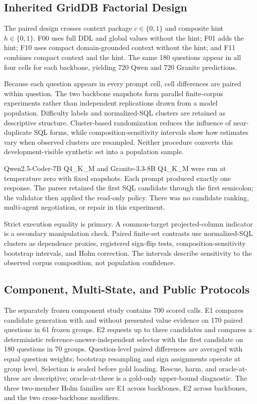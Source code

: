 \documentclass[applsci,article,submit,moreauthors]{Definitions/mdpi}
\begin{document}
\subsection{Inherited GridDB Factorial Design}

The paired design crosses context package $c\in\{0,1\}$ and composite hint $h\in\{0,1\}$. F00 uses full DDL and global values without the hint; F01 adds the hint; F10 uses compact domain-grounded context without the hint; and F11 combines compact context and the hint. The same 180 questions appear in all four cells for each backbone, yielding 720 Qwen and 720 Granite predictions.

Because each question appears in every prompt cell, cell differences are paired within question. The two backbone snapshots form parallel finite-corpus experiments rather than independent replications drawn from a model population. Difficulty labels and normalized-SQL clusters are retained as descriptive structure. Cluster-based randomization reduces the influence of near-duplicate SQL forms, while composition-sensitivity intervals show how estimates vary when observed clusters are resampled. Neither procedure converts this development-visible synthetic set into a population sample.

Qwen2.5-Coder-7B Q4\_K\_M and Granite-3.3-8B Q4\_K\_M were run at temperature zero with fixed snapshots. Each prompt produced exactly one response. The parser retained the first SQL candidate through the first semicolon; the validator then applied the read-only policy. There was no candidate ranking, multi-agent negotiation, or repair in this experiment.

Strict execution equality is primary. A common-target projected-column indicator is a secondary manipulation check. Paired finite-set contrasts use normalized-SQL clusters as dependence proxies, registered sign-flip tests, composition-sensitivity bootstrap intervals, and Holm correction. The intervals describe sensitivity to the observed corpus composition, not population confidence.

\subsection{Component, Multi-State, and Public Protocols}

The separately frozen component study contains 700 scored calls. E1 compares candidate generation with and without presented value evidence on 170 paired questions in 61 frozen groups. E2 requests up to three candidates and compares a deterministic reference-answer-independent selector with the first candidate on 180 questions in 70 groups. Question-level paired differences are averaged with equal question weights; bootstrap resampling and sign assignments operate at group level. Selection is sealed before gold loading. Rescue, harm, and oracle-at-three are descriptive; oracle-at-three is a gold-only upper-bound diagnostic. The three two-member Holm families are E1 across backbones, E2 across backbones, and the two cross-backbone modifiers.
\end{document}
